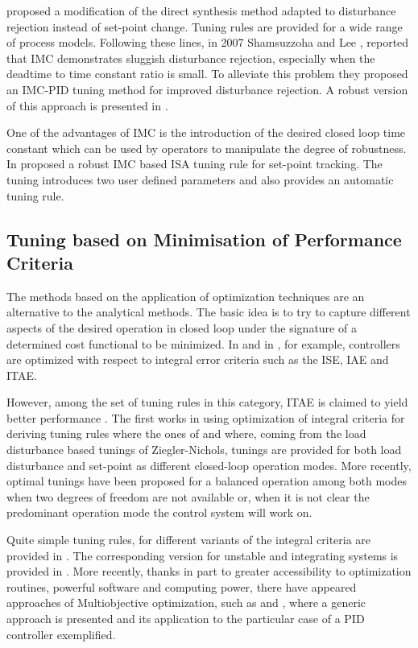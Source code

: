 \citet{chenseborg2002} proposed a modification of the direct synthesis method adapted to disturbance rejection instead of set-point change. Tuning rules are provided for a wide range of process models. Following these lines, in 2007  Shamsuzzoha and Lee \citet{shamsu2008}, reported that IMC demonstrates sluggish disturbance rejection, especially when the deadtime to time constant ratio is small. To alleviate this problem they proposed an IMC-PID tuning method for improved disturbance rejection. A robust version of this approach is presented in \citet{Vilanova2018}.

One of the advantages of IMC is the introduction of the desired closed loop time constant which can be used by operators to manipulate the degree of robustness. In \citet{vilanovaJPC2008} proposed a robust IMC based ISA tuning rule for set-point tracking. The tuning introduces two user defined parameters and also provides an automatic tuning rule. 


\subsection{Tuning based on Minimisation of Performance Criteria}

The methods based on the application of optimization techniques are an alternative to the analytical methods. The basic idea is to try to capture different aspects of the desired operation in closed loop under the signature of a determined cost functional to be minimized. In \citet{corripio2001} and in \citet{shinskey.1994}, for example, controllers are  optimized with respect to integral error criteria such as the  ISE, IAE and ITAE.

However, among the set of tuning rules in this category, ITAE is claimed to yield better performance \citet{ogatabook}. The first works in using optimization of integral criteria for deriving tuning rules where the ones of \citet{lopez1967} and \citet{Rovira1969a}   where, coming from the load disturbance based tunings of Ziegler-Nichols, tunings are provided for both load disturbance and set-point as different closed-loop operation modes. More recently, optimal tunings have been proposed \citep{Arrieta2010} for a balanced operation among both modes when two degrees of freedom are not available or, when it is not clear the predominant operation mode the control system will work on.

Quite simple tuning rules, for different variants of the integral criteria are provided in \citet{zhuang1993}. The corresponding version for unstable and integrating systems is provided in \citet{visioli2001}. More recently, thanks in part to greater accessibility to optimization routines, powerful software and computing power, there have appeared approaches of Multiobjective optimization, such as \citet{herreros2002}  and \citet{toivonen2006}, where a generic approach is presented and its application to the particular case of a PID controller exemplified. 

